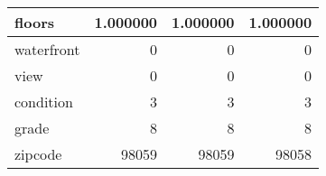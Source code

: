 \begin{table}[H]
\begin{tabular}{|l|r|r|r|}
\hline floors & \cellcolor[rgb]{0.9, 0.54, 0.52} 1.000000 & \cellcolor[rgb]{0.9, 0.54, 0.52} 1.000000 & \cellcolor[rgb]{0.9, 0.54, 0.52} 1.000000 \\
\hline waterfront & \cellcolor[rgb]{0.9, 0.54, 0.52} 0 & \cellcolor[rgb]{0.9, 0.54, 0.52} 0 & \cellcolor[rgb]{0.9, 0.54, 0.52} 0 \\
\hline view & \cellcolor[rgb]{0.9, 0.54, 0.52} 0 & \cellcolor[rgb]{0.9, 0.54, 0.52} 0 & \cellcolor[rgb]{0.9, 0.54, 0.52} 0 \\
\hline condition & \cellcolor[rgb]{0.9, 0.54, 0.52} 3 & \cellcolor[rgb]{0.9, 0.54, 0.52} 3 & \cellcolor[rgb]{0.9, 0.54, 0.52} 3 \\
\hline grade & \cellcolor[rgb]{0.9, 0.54, 0.52} 8 & \cellcolor[rgb]{0.9, 0.54, 0.52} 8 & \cellcolor[rgb]{0.9, 0.54, 0.52} 8 \\
\hline zipcode & \cellcolor[rgb]{0.9, 0.54, 0.52} 98059 & \cellcolor[rgb]{0.9, 0.54, 0.52} 98059 & 98058 \\
\hline
\end{tabular}
\end{table}
